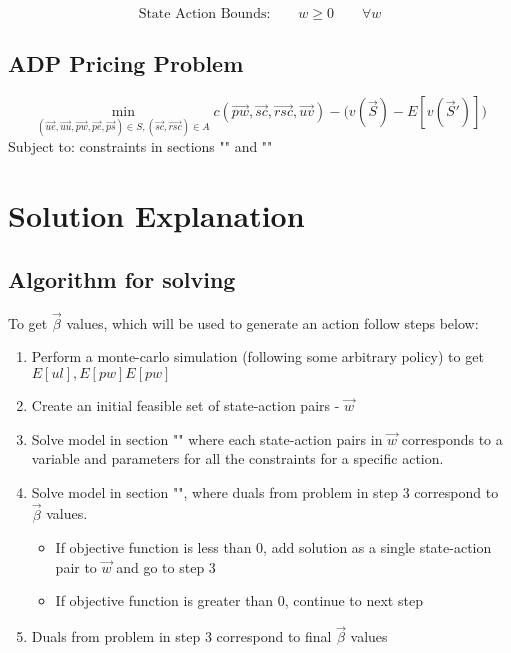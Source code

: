 \begin{equation}
	\text{State Action Bounds:} \qquad w \ge 0 \qquad \forall w
\end{equation}


\subsection{ADP Pricing Problem}
\label{Pricing Problem}
\begin{equation}
	\min_{(\vec{ue}, \vec{uu}, \vec{pw}, \vec{pe}, \vec{ps}) \in S,  (\vec{sc}, \vec{rsc}) \in A } c(\vec{pw},\vec{sc},\vec{rsc},\vec{uv}) - \Big(v(\vec{S}) - E[v(\vec{S}')] \Big)
\end{equation}
Subject to:
constraints in sections "" and ""

\section{Solution Explanation}
\subsection{Algorithm for solving}
To get $\vec{\beta}$ values, which will be used to generate an action follow steps below:
\begin{enumerate}
	\item Perform a monte-carlo simulation (following some arbitrary policy) to get $E[ul], E[pw] E[pw]$
	\item Create an initial feasible set of state-action pairs - $\vec{w}$
	\item Solve model in section "" where each state-action pairs in $\vec{w}$ corresponds to a variable and parameters for all the constraints for a specific action.
	\item Solve model in section "", where duals from problem in step 3  correspond to $\vec{\beta}$ values. 
	\begin{itemize}
		\item If objective function is less than 0, add solution as a single state-action pair to $\vec{w}$ and go to step 3
		\item If objective function is greater than 0, continue to next step
	\end{itemize}
	\item Duals from problem in step 3 correspond to final $\vec{\beta}$ values
\end{enumerate}

